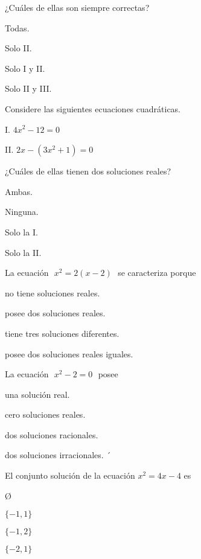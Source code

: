 \documentclass[12pt, fleqn]{article}
\begin{document}
¿Cuáles de ellas son siempre {\sc correctas}?

\benu
\item[] \opc Todas.
\item[] \opc Solo II.
\item[] \opc Solo I y II.
\item[] \opc Solo II y III.
\eenu
\vs

\pagebreak

\item Considere las siguientes ecuaciones cuadráticas.
\vp

\begin{tcolorbox}
\bc
\benu
\item[I.] $4x^2-12=0$
\item[II.] $2x-(3x^2+1)=0$
\eenu
\ec
\end{tcolorbox}

¿Cuáles de ellas tienen dos soluciones reales?

\benu
\item[] \opc Ambas.
\item[] \opc Ninguna.
\item[] \opc Solo la I.
\item[] \opc Solo la II.
\eenu
\vs

\item La ecuación $\,\,x^2=2(x-2)\,\,$ se caracteriza porque
\vp

\benu
\item[] \opc no tiene soluciones reales.
\item[] \opc posee dos soluciones reales.
\item[] \opc tiene tres soluciones diferentes.
\item[] \opc posee dos soluciones reales iguales.
\eenu
\vp

\item La ecuación $\,\,x^2-2=0\,\,$ posee
\vp

\benu
\item[] \opc una solución real.
\item[] \opc cero soluciones reales.
\item[] \opc dos soluciones racionales.
\item[] \opc dos soluciones irracionales.
\eenu
´
\item El conjunto solución de la ecuación $x^2=4x-4$ es
\vp

\benu
\item[] \opc \O \vp
\item[] \opc $\{-1,1\}$ \vp
\item[] \opc $\{-1,2\}$ \vp
\item[] \opc $\{-2,1\}$
\eenu
\vs
\end{document}
